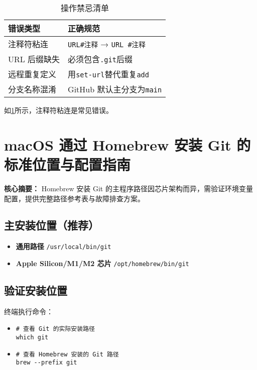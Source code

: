 \begin{table}[ht]
  \centering
  \caption{操作禁忌清单}  %
  \begin{tabular}{@{}ll@{}}
    \toprule
    \textbf{错误类型} & \textbf{正确规范} \\
    \midrule
    注释符粘连 & \texttt{URL#注释} → \texttt{URL #注释} \\
    URL 后缀缺失 & 必须包含\texttt{.git}后缀 \\
    远程重复定义 & 用\texttt{set-url}替代重复\texttt{add} \\
    分支名称混淆 & GitHub 默认主分支为\texttt{main} \\
    \bottomrule
  \end{tabular}
  \label{tab:forbidden_ops}  %
\end{table}

如\ref{tab:forbidden_ops}所示，注释符粘连是常见错误。

\section{macOS 通过 Homebrew 安装 Git 的标准位置与配置指南}
\textbf{核心摘要：}  
Homebrew 安装 Git 的主程序路径因芯片架构而异，需验证环境变量配置，提供完整路径参考表与故障排查方案。

\subsection{主安装位置（推荐）}
\begin{itemize}[leftmargin=*, nosep]
    \item \textbf{通用路径}  
    \texttt{/usr/local/bin/git}
    \item \textbf{Apple Silicon/M1/M2 芯片}  
    \texttt{/opt/homebrew/bin/git}
\end{itemize}

\subsection{验证安装位置}
终端执行命令：
\begin{itemize}[leftmargin=*, nosep]
    \item \texttt{\# 查看 Git 的实际安装路径} \\ 
    \texttt{which git}
    
    \item \texttt{\# 查看 Homebrew 安装的 Git 路径} \\ 
    \texttt{brew {-}{-}prefix git}
\end{itemize}

